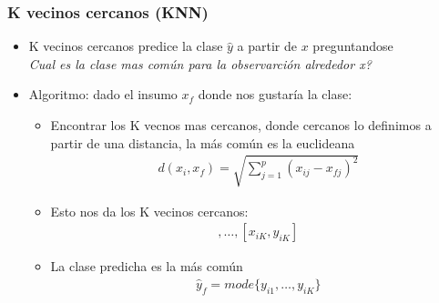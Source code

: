 \documentclass[
  shownotes,
  xcolor={svgnames},
  hyperref={colorlinks,citecolor=DarkBlue,linkcolor=DarkRed,urlcolor=DarkBlue}
  , aspectratio=169]{beamer}
\begin{document}
\begin{frame}[fragile]
\frametitle{K vecinos cercanos (KNN)}

\begin{itemize}
\item K vecinos cercanos predice la clase $\hat y$ a partir de $x$ preguntandose \\
{\it Cual es la clase mas común para la observarción alrededor x?}
\item Algoritmo: dado el insumo  $x_f$ donde nos gustaría la clase:

\begin{itemize}
  \item Encontrar los K vecnos mas cercanos, donde cercanos lo definimos a partir de una distancia, la más común es la euclideana
  \begin{align}
  d(x_i,x_f)=\sqrt{\sum_{j=1}^p(x_{ij}-x_{fj})^2}
  \end{align}
  \item Esto nos da los K vecinos cercanos:
  \begin{align}
  [x_{i1},y_{i1}],\dots,[x_{iK},y_{iK}]
  \end{align}
  \item La clase predicha es la más común
  \begin{align}
  \hat{y}_f =mode\{y_{i1},\dots,y_{iK}\}
  \end{align}
\end{itemize}

\end{itemize}
\end{frame}
\end{document}
